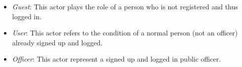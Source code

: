 \begin{itemize}
	\item \textit{Guest}: This actor plays the role of a person who is not registered and thus logged in.
	\item \textit{User}: This actor refers to the condition of a normal person (not an officer) already signed up and logged.
	\item \textit{Officer}: This actor represent a signed up and logged in public officer.
\end{itemize}